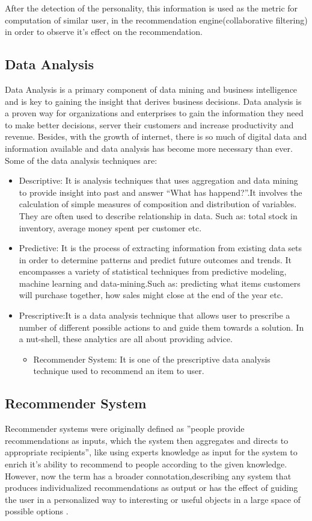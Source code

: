 After the detection of the personality, this information is used as the metric for computation of similar user, in the recommendation engine(collaborative filtering) in order to observe it's effect on the recommendation.

\subsection{Data Analysis}
Data Analysis \cite{analysis} is a primary component of data mining and business intelligence and is key to gaining the insight that derives business decisions. Data analysis is a proven way for organizations and enterprises to gain the information they need to make better decisions, server their customers and increase productivity and revenue. Besides, with the growth of internet, there is so much of digital data and information available and data analysis has become more necessary than ever. 
Some of the data analysis techniques are:
\begin{itemize}
	\item Descriptive: It is analysis techniques that uses aggregation and data mining to provide insight into past and answer ``What has happend?''.It involves the calculation of simple measures of composition and distribution of variables. They are often used to describe relationship in data. Such as: total stock in inventory, average money spent per customer etc.
	\item Predictive: It is the process of extracting information from existing data sets in order to determine patterns and predict future outcomes and trends. It encompasses a variety of statistical techniques from predictive modeling, machine learning and data-mining.Such as: predicting what items customers will purchase together, how sales might close at the end of the year etc.
	\item Prescriptive:It is a data analysis technique that allows user to prescribe a number of different possible actions to and guide them towards a solution. In a nut-shell, these analytics are all about providing advice.
		\begin{itemize}
			\item Recommender System: It is one of the prescriptive data analysis technique used to recommend an item to user.
		\end{itemize}
	\end{itemize}
\subsection{Recommender System}
Recommender systems were originally defined as ''people provide recommendations as inputs, which the system then aggregates and directs to appropriate recipients'', like using experts knowledge as input for the system to enrich it's ability to recommend to people according to the given knowledge. However, now the term has a broader connotation,describing any system that produces individualized recommendations as output or has the effect of guiding the user in a personalized way to interesting or useful objects in a large space of possible options \cite{rdef}.

